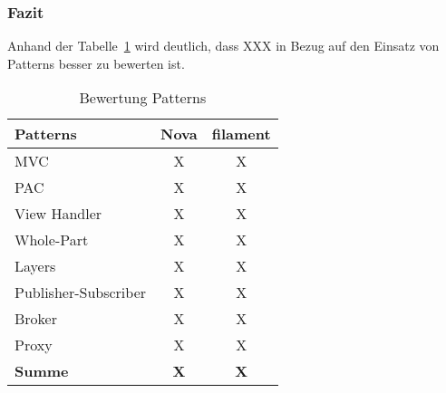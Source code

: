 \subsubsection{Fazit}
Anhand der Tabelle~\ref{tab:bewertung-patterns} wird deutlich, dass XXX in Bezug auf den Einsatz von Patterns besser zu bewerten ist.

\begin{table}[]
    \caption{Bewertung Patterns}
    \label{tab:bewertung-patterns}
    \centering
    \begin{tabular}{|l|c|c|}
        \hline
        \textbf{Patterns}    & \textbf{Nova} & \textbf{filament} \\ \hline
        MVC                  & X             & X                 \\ \hline
        PAC                  & X             & X                 \\ \hline
        View Handler         & X             & X                 \\ \hline
        Whole-Part           & X             & X                 \\ \hline
        Layers               & X             & X                 \\ \hline
        Publisher-Subscriber & X             & X                 \\ \hline
        Broker               & X             & X                 \\ \hline
        Proxy                & X             & X                 \\ \hline
        \textbf{Summe}       & \textbf{X}    & \textbf{X}        \\ \hline
    \end{tabular}
\end{table}

\color{black}
